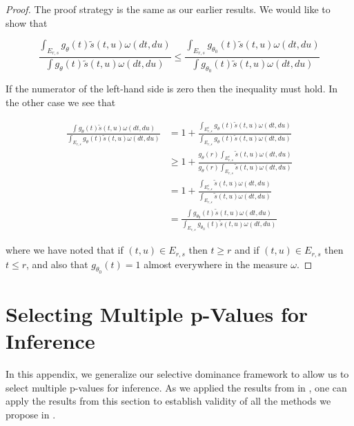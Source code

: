 \documentclass{article}
\begin{document}
\begin{appendix}
\begin{proof}
    The proof strategy is the same as our earlier results. We would like to show that 

    \begin{equation*}
        \frac{\int_{E_{r, s}} g_{\theta}(t) \tilde{s}(t, u) \omega(dt, du) }{\int g_{\theta}(t) \tilde{s}(t, u) \omega(dt, du) } \leq  \frac{\int_{E_{r, s}} g_{\theta_0}(t) \tilde{s}(t, u) \omega(dt, du) }{\int g_{\theta_0}(t) \tilde{s}(t, u) \omega(dt, du) } 
    \end{equation*}

    If the numerator of the left-hand side is zero then the inequality must hold. In the other case we see that 

    \begin{align*}
        \frac{\int g_{\theta}(t) \tilde{s}(t, u) \omega(dt, du)}{\int_{E_{r, s}} g_{\theta}(t) \tilde{s}(t, u) \omega(dt, du) } &= 1 + \frac{\int_{E_{r, s}^c} g_{\theta}(t) \tilde{s}(t, u) \omega(dt, du)}{\int_{E_{r, s}} g_{\theta}(t) \tilde{s}(t, u) \omega(dt, du) } \\
        &\geq 1 + \frac{ g_{\theta}(r) \int_{E_{r, s}^c} \tilde{s}(t, u) \omega(dt, du)}{g_{\theta}(r)\int_{E_{r, s}}  \tilde{s}(t, u) \omega(dt, du) } \\
        &= 1 + \frac{  \int_{E_{r, s}^c} \tilde{s}(t, u) \omega(dt, du)}{\int_{E_{r, s}}  \tilde{s}(t, u) \omega(dt, du) }\\
        &= \frac{\int g_{\theta_0}(t) \tilde{s}(t, u) \omega(dt, du)}{\int_{E_{r, s}} g_{\theta_0}(t) \tilde{s}(t, u) \omega(dt, du) }
    \end{align*}

    where we have noted that if $(t, u) \in E_{r, s}$ then $t \geq r$ and if $(t, u) \in E_{r, s}$ then $t \leq r$, and also that $g_{\theta_0}(t) = 1$ almost everywhere in the measure $\omega$.  
\end{proof}

\section{Selecting Multiple p-Values for Inference}
\label{sec:multiple_p_vals_appdx}

In this appendix, we generalize our selective dominance framework to allow us to select multiple p-values for inference. As we applied the results from  in , one can apply the results from this section to establish validity of all the methods we propose in . 


\end{appendix}
\end{document}
